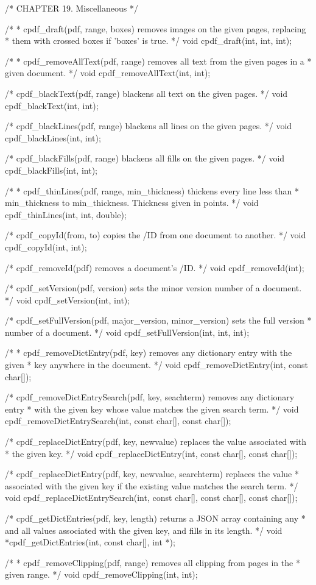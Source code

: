 /* CHAPTER 19. Miscellaneous */

/*
 * cpdf_draft(pdf, range, boxes) removes images on the given pages, replacing
 * them with crossed boxes if 'boxes' is true.
 */
void cpdf_draft(int, int, int);

/*
 * cpdf_removeAllText(pdf, range) removes all text from the given pages in a
 * given document.
 */
void cpdf_removeAllText(int, int);

/* cpdf_blackText(pdf, range) blackens all text on the given pages. */
void cpdf_blackText(int, int);

/* cpdf_blackLines(pdf, range) blackens all lines on the given pages. */
void cpdf_blackLines(int, int);

/* cpdf_blackFills(pdf, range) blackens all fills on the given pages. */
void cpdf_blackFills(int, int);

/*
 * cpdf_thinLines(pdf, range, min_thickness) thickens every line less than
 * min_thickness to min_thickness. Thickness given in points.
 */
void cpdf_thinLines(int, int, double);

/* cpdf_copyId(from, to) copies the /ID from one document to another. */
void cpdf_copyId(int, int);

/* cpdf_removeId(pdf) removes a document's /ID. */
void cpdf_removeId(int);

/* cpdf_setVersion(pdf, version) sets the minor version number of a document. */
void cpdf_setVersion(int, int);

/* cpdf_setFullVersion(pdf, major_version, minor_version) sets the full version
 * number of a document. */
void cpdf_setFullVersion(int, int, int);

/*
 * cpdf_removeDictEntry(pdf, key) removes any dictionary entry with the given
 * key anywhere in the document.
 */
void cpdf_removeDictEntry(int, const char[]);

/* cpdf_removeDictEntrySearch(pdf, key, seachterm) removes any dictionary entry
 * with the given key whose value matches the given search term. */
void cpdf_removeDictEntrySearch(int, const char[], const char[]);

/* cpdf_replaceDictEntry(pdf, key, newvalue) replaces the value associated with
 * the given key. */
void cpdf_replaceDictEntry(int, const char[], const char[]);

/* cpdf_replaceDictEntry(pdf, key, newvalue, searchterm) replaces the value
 * associated with the given key if the existing value matches the search term.
 */
void cpdf_replaceDictEntrySearch(int, const char[], const char[], const char[]);

/* cpdf_getDictEntries(pdf, key, length) returns a JSON array containing any
 * and all values associated with the given key, and fills in its length. */
void *cpdf_getDictEntries(int, const char[], int *);

/*
 * cpdf_removeClipping(pdf, range) removes all clipping from pages in the
 * given range.
 */
void cpdf_removeClipping(int, int);
